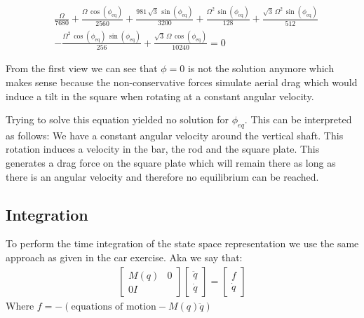 \begin{equation}
    \begin{split}
        &\frac{\Omega }{7680}+\frac{\Omega \,\cos\left(\phi _{\mathrm{eq}}\right)}{2560}+\frac{981\,\sqrt{3}\,\sin\left(\phi _{\mathrm{eq}}\right)}{3200}+\frac{\Omega ^2\,\sin\left(\phi _{\mathrm{eq}}\right)}{128}+\frac{\sqrt{3}\,\Omega ^2\,\sin\left(\phi _{\mathrm{eq}}\right)}{512}\\
        &-\frac{\Omega ^2\,\cos\left(\phi _{\mathrm{eq}}\right)\,\sin\left(\phi _{\mathrm{eq}}\right)}{256}+\frac{\sqrt{3}\,\Omega \,\cos\left(\phi _{\mathrm{eq}}\right)}{10240} = 0
    \end{split}
\end{equation}

From the first view we can see that $\phi = 0$ is not the solution anymore which makes sense because the non-conservative forces simulate aerial drag which would induce a tilt in the square when rotating at a constant angular velocity.

Trying to solve this equation yielded no solution for $\phi_{eq}$. This can be interpreted as follows: We have a constant angular velocity around the vertical shaft. This rotation induces a velocity in the bar, the rod and the square plate. This generates a drag force on the square plate which will remain there as long as there is an angular velocity and therefore no equilibrium can be reached.



\subsection{Integration}

To perform the time integration of the state space representation we use the same approach as given in the car exercise. Aka we say that:
\begin{equation}
    \begin{split}
        \begin{bmatrix}
            M(q) & 0 \\
            0 I
        \end{bmatrix}\begin{bmatrix}
            \ddot q\\\dot q
        \end{bmatrix} = \begin{bmatrix}
            f\\\dot q
        \end{bmatrix}
    \end{split}
\end{equation}
Where $f = -(\text{equations of motion} - M(q)\ddot q)$

